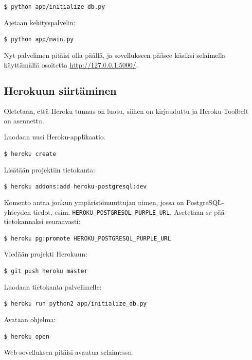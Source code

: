 \documentclass{article}
\begin{document}
\texttt{\$ python app/initialize\_db.py}

Ajetaan kehityspalvelin:

\texttt{\$ python app/main.py}

Nyt palvelimen pitäisi olla päällä, ja sovellukseen pääsee käsiksi selaimella käyttämällä osoitetta \url{http://127.0.0.1:5000/}.

\subsection{Herokuun siirtäminen}

Oletetaan, että Heroku-tunnus on luotu, siihen on kirjauduttu ja Heroku Toolbelt on asennettu.

Luodaan uusi Heroku-applikaatio.

\texttt{\$ heroku create}

Lisätään projektiin tietokanta:

\texttt{\$ heroku addons:add heroku-postgresql:dev}

Komento antaa jonkun ympäristömuuttujan nimen, jossa on PostgreSQL-yhteyden tiedot, esim. \verb+HEROKU_POSTGRESQL_PURPLE_URL+. Asetetaan se pää-tietokannaksi seuraavasti:

\texttt{\$ heroku pg:promote HEROKU\_POSTGRESQL\_PURPLE\_URL}

Viedään projekti Herokuun:

\texttt{\$ git push heroku master}

Luodaan tietokanta palvelimelle:

\texttt{\$ heroku run python2 app/initialize\_db.py}

Avataan ohjelma:

\texttt{\$ heroku open}

Web-sovelluksen pitäisi avautua selaimessa.
\end{document}
